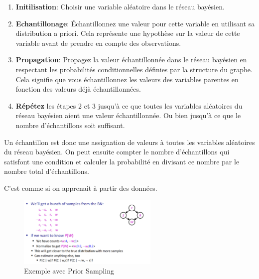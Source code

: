 \begin{enumerate}
    \item \textbf{Initilisation}: Choisir une variable aléatoire dans le réseau bayésien.
    \item \textbf{Echantillonage}: Échantillonnez une valeur pour cette variable en utilisant sa distribution a priori. 
        Cela représente une hypothèse sur la valeur de cette variable avant de prendre en compte des observations.
    \item \textbf{Propagation}: Propagez la valeur échantillonnée dans le réseau bayésien en 
        respectant les probabilités conditionnelles définies par la structure du graphe. 
        Cela signifie que vous échantillonnez les valeurs des variables parentes en fonction des valeurs déjà échantillonnées.
    \item \textbf{Répétez} les étapes 2 et 3 jusqu'à ce que toutes les variables aléatoires du réseau bayésien aient une valeur échantillonnée. Ou bien jusqu'à ce que le nombre d'échantillons soit suffisant.
\end{enumerate}

Un échantillon est donc une assignation de valeurs à toutes les variables aléatoires du réseau bayésien.
On peut ensuite compter le nombre d'échantillons qui satisfont une condition et calculer la probabilité en divisant ce nombre par le nombre total d'échantillons.


\begin{remark}\leavevmode
    C'est comme si on apprenait à partir des données.
\end{remark}

\begin{figure}[H]
    \begin{center}
        \includegraphics[width=0.6\textwidth]{pictures/priors.png}
    \end{center}
    \caption{Exemple avec Prior Sampling}\label{fig:priors}
\end{figure}


